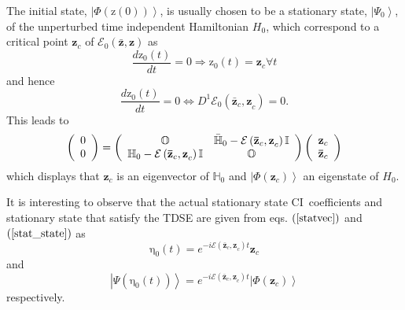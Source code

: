 \documentclass[aps,preprint]{revtex4}%
\begin{document}
The initial state, $\left\vert \Phi\left(  \mathrm{z}\left(  0\right)
\right)  \right\rangle $, is usually chosen to be a stationary state,
$\left\vert \Psi_{0}\right\rangle $, of the unperturbed time independent
Hamiltonian $H_{0}$, which correspond to a critical point $\mathbf{z}_{c}$ of
$\mathcal{E}_{0}\left(  \mathbf{\mathbf{\bar{z}},\mathbf{z}}\right)  $ as
\begin{equation}
\frac{d\mathrm{z}_{0}\left(  t\right)  }{dt}=0\Rightarrow\mathrm{z}_{0}\left(
t\right)  =\mathbf{\mathbf{z}}_{c}\forall t
\end{equation}
and hence
\begin{equation}
\frac{d\mathrm{z}_{0}\left(  t\right)  }{dt}=0\Leftrightarrow D^{1}%
\mathcal{E}_{0}\left(  \mathbf{\mathbf{\bar{z}}}_{c}\mathbf{,\mathbf{z}}%
_{c}\right)  =0.
\end{equation}
This leads to
\begin{equation}
\left(
\begin{array}
[c]{c}%
0\\
0
\end{array}
\right)  =\left(
\begin{array}
[c]{cc}%
\mathbb{O} & \mathbb{\bar{H}}_{0}-\mathcal{E}\left(  \mathbf{\mathbf{\bar{z}}%
}_{c}\mathbf{,\mathbf{z}}_{c}\right)  \mathbb{I}\\
\mathbb{H}_{0}-\mathcal{E}\left(  \mathbf{\mathbf{\bar{z}}}_{c}%
\mathbf{,\mathbf{z}}_{c}\right)  \mathbb{I} & \mathbb{O}%
\end{array}
\right)  \left(
\begin{array}
[c]{c}%
\mathbf{\mathbf{z}}_{c}\\
\mathbf{\mathbf{\bar{z}}}_{c}%
\end{array}
\right)
\end{equation}
which displays that $\mathbf{\mathbf{z}}_{c}$ is an eigenvector of
$\mathbb{H}_{0}$ and $\left\vert \Phi\left(  \mathbf{z}_{c}\right)
\right\rangle $ an eigenstate of $H_{0}$.

It is interesting to observe that the actual stationary state CI\ coefficients
and stationary state that satisfy the TDSE are given from eqs. $\left(
\ref{statvec}\right)  $ and $\left(  \ref{stat_state}\right)  $ as
\begin{equation}
\mathrm{\eta}_{0}\left(  t\right)  =e^{-i\mathcal{E}\left(
\mathbf{\mathbf{\bar{z}}}_{c}\mathbf{,\mathbf{z}}_{c}\right)  t}%
\mathbf{\mathbf{z}}_{c}%
\end{equation}
and
\begin{equation}
\left\vert \Psi\left(  \mathrm{\eta}_{0}\left(  t\right)  \right)
\right\rangle =e^{-i\mathcal{E}\left(  \mathbf{\mathbf{\bar{z}}}%
_{c}\mathbf{,\mathbf{z}}_{c}\right)  t}\left\vert \Phi\left(
\mathbf{\mathbf{z}}_{c}\right)  \right\rangle
\end{equation}
respectively.
\end{document}
